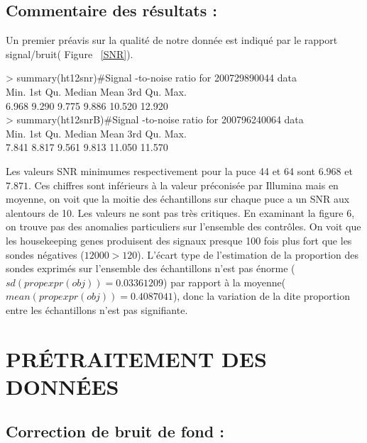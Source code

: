 \documentclass[a4paper,10pt]{article}
\newcommand\tabA[1][0.5cm]{\hspace*{#1}}
\begin{document}
\subsection{ Commentaire des résultats :}
Un premier préavis sur la qualité de notre donnée est indiqué par le rapport signal/bruit( Figure ~\ref{SNR}).\\
\begin{scriptsize}
  > summary(ht12snr)\#Signal -to-noise  ratio  for  200729890044  data\\
   \tabA Min.	1st Qu. 	Median 	Mean 	3rd Qu. 	Max. \\
  \tabA 6.968   9.290   9.775   9.886  10.520  12.920 \\
  > summary(ht12snrB)\#Signal -to-noise  ratio  for  200796240064  data\\
  \tabA Min. 1st Qu.  Median    Mean 3rd Qu.    Max. \\
  \tabA 7.841   8.817   9.561   9.813  11.050  11.570 \\
\end{scriptsize}
Les valeurs SNR minimumes respectivement pour la puce 44 et 64 sont $6.968$ et $7.871$. Ces chiffres sont inférieurs à la valeur préconisée par Illumina mais en moyenne, on voit que la moitie des échantillons sur chaque puce a un SNR aux alentours de 10. Les valeurs ne sont pas très critiques.
En examinant la figure 6, on trouve pas des anomalies particuliers sur l’ensemble des contrôles. On voit que les  housekeeping genes produisent des signaux presque 100 fois plus fort que les sondes négatives ($12000 > 120$).
L’écart type de l’estimation de la proportion des sondes exprimés sur l’ensemble des échantillons n’est pas énorme ($sd(propexpr(obj))=0.03361209$) par rapport à la moyenne($mean(propexpr(obj))=0.4087041$), donc la variation de la dite proportion entre les échantillons n'est pas signifiante.
\section{PR\'{E}TRAITEMENT DES DONN\'{E}ES }
\subsection{Correction de bruit de fond :}
\end{document}
